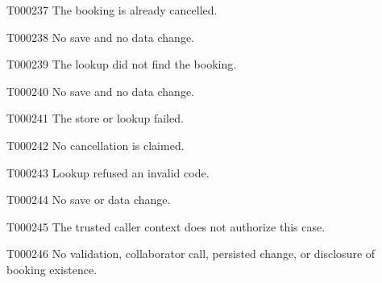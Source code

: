\documentclass[11pt,a4paper]{article}
\begin{document}
\begin{atlasparagraph}{T000237}
The booking is already cancelled.
\end{atlasparagraph}
\begin{atlasparagraph}{T000238}
No save and no data change.
\end{atlasparagraph}
\begin{atlasparagraph}{T000239}
The lookup did not find the booking.
\end{atlasparagraph}
\begin{atlasparagraph}{T000240}
No save and no data change.
\end{atlasparagraph}
\begin{atlasparagraph}{T000241}
The store or lookup failed.
\end{atlasparagraph}
\begin{atlasparagraph}{T000242}
No cancellation is claimed.
\end{atlasparagraph}
\begin{atlasparagraph}{T000243}
Lookup refused an invalid code.
\end{atlasparagraph}
\begin{atlasparagraph}{T000244}
No save or data change.
\end{atlasparagraph}
\begin{atlasparagraph}{T000245}
The trusted caller context does not authorize this case.
\end{atlasparagraph}
\begin{atlasparagraph}{T000246}
No validation, collaborator call, persisted change, or disclosure of booking existence.
\end{atlasparagraph}
\end{document}
